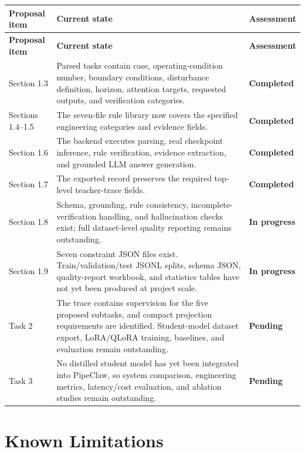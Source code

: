 \documentclass[11pt,a4paper]{article}
\newcommand{\done}{\textcolor{donegreen}{\textbf{Completed}}}
\newcommand{\progress}{\textcolor{progressorange}{\textbf{In progress}}}
\newcommand{\pending}{\textcolor{pendinggray}{\textbf{Pending}}}
\begin{document}
\begin{longtable}{p{}p{}p{}}
\toprule
\textbf{Proposal item} & \textbf{Current state} & \textbf{Assessment} \\
\midrule
\endfirsthead
\toprule
\textbf{Proposal item} & \textbf{Current state} & \textbf{Assessment} \\
\midrule
\endhead
Section 1.3 & Parsed tasks contain case, operating-condition number, boundary conditions, disturbance definition, horizon, attention targets, requested outputs, and verification categories. & \done \\
Sections 1.4--1.5 & The seven-file rule library now covers the specified engineering categories and evidence fields. & \done \\
Section 1.6 & The backend executes parsing, real checkpoint inference, rule verification, evidence extraction, and grounded LLM answer generation. & \done \\
Section 1.7 & The exported record preserves the required top-level teacher-trace fields. & \done \\
Section 1.8 & Schema, grounding, rule consistency, incomplete-verification handling, and hallucination checks exist; full dataset-level quality reporting remains outstanding. & \progress \\
Section 1.9 & Seven constraint JSON files exist. Train/validation/test JSONL splits, schema JSON, quality-report workbook, and statistics tables have not yet been produced at project scale. & \progress \\
Task 2 & The trace contains supervision for the five proposed subtasks, and compact projection requirements are identified. Student-model dataset export, LoRA/QLoRA training, baselines, and evaluation remain outstanding. & \pending \\
Task 3 & No distilled student model has yet been integrated into PipeClaw, so system comparison, engineering metrics, latency/cost evaluation, and ablation studies remain outstanding. & \pending \\
\bottomrule
\end{longtable}

\section{Known Limitations}
\end{document}
